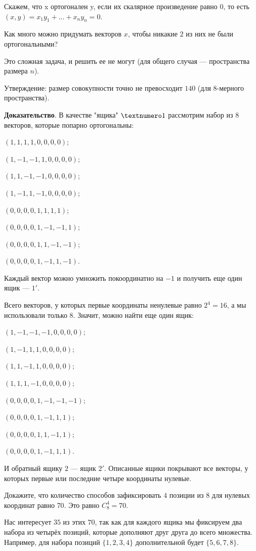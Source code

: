 \documentclass[paper=a4, fontsize=11pt]{scrartcl}
\begin{document}
Скажем, что x ортогонален y, если их скалярное произведение равно $0$, то есть $(x, y) = x_1y_1 + ... + x_ny_n = 0$.

Как много можно придумать векторов $x$, чтобы никакие $2$ из них не были ортогональными?

Это сложная задача, и решить ее не могут (для общего случая --- пространства размера $n$).

Утверждение: размер совокупности точно не превосходит $140$ (для $8$-мерного пространства).

\textbf{Доказательство}.
В качестве "ящика" $\textnumero1$ рассмотрим набор из $8$ векторов, которые попарно ортогональны:

$(1,1,1,1,0,0,0,0)$;

$(1,-1,-1,1,0,0,0,0)$;

$(1,1,-1,-1,0,0,0,0)$;

$(1,-1,1,-1,0,0,0,0)$;

$(0,0,0,0,1,1,1,1)$;

$(0,0,0,0,1,-1,-1,1)$;

$(0,0,0,0,1,1,-1,-1)$;

$(0,0,0,0,1,-1,1,-1)$.

Каждый вектор можно умножить покоординатно на $-1$ и получить еще один ящик --- $1'$.

Всего векторов, у которых первые координаты ненулевые равно $2^4 = 16$, а мы использовали только $8$. Значит, можно найти еще один ящик:

$(1,-1,-1,-1,0,0,0,0);$

$(1,-1,1,1,0,0,0,0);$

$(1,1,-1,1,0,0,0,0);$

$(1,1,1,-1,0,0,0,0);$

$(0,0,0,0,1,-1,-1,-1);$

$(0,0,0,0,1,-1,1,1);$

$(0,0,0,0,1,1,-1,1);$

$(0,0,0,0,1,-1,1,1).$

И обратный ящику $2$ --- ящик $2'$.
Описанные ящики покрывают все векторы, у которых первые или последние четыре координаты нулевые.

Докажите, что количество способов зафиксировать $4$ позиции из $8$ для нулевых координат равно $70$.
Это равно $C_8^4 = 70$.

Нас интересует $35$ из этих $70$, так как для каждого ящика мы фиксируем два набора из четырёх позиций, которые дополняют друг друга до всего множества. Например, для набора позиций $\{1,2,3,4\}$ дополнительной будет $\{5,6,7,8\}$.
\end{document}
